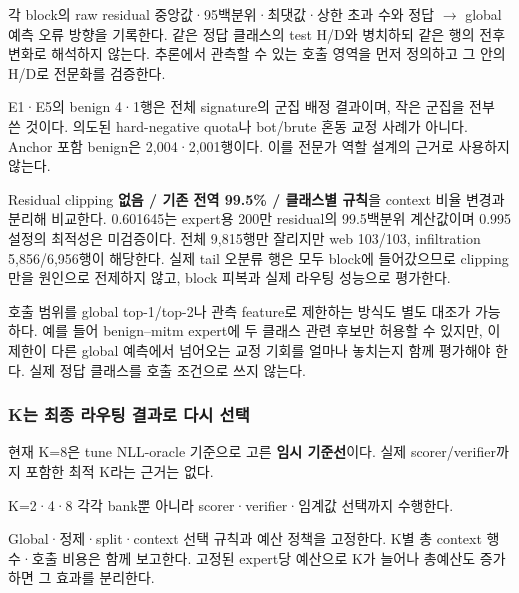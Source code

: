 \par\noindent \textbullet\enspace 각 block의 raw residual 중앙값·95백분위·최댓값·상한 초과 수와 정답 \ensuremath{\rightarrow} global 예측 오류 방향을 기록한다. 같은 정답 클래스의 test H/\allowbreak{}D와 병치하되 같은 행의 전후 변화로 해석하지 않는다. 추론에서 관측할 수 있는 호출 영역을 먼저 정의하고 그 안의 H/\allowbreak{}D로 전문화를 검증한다.


\par\noindent \textbullet\enspace E1·E5의 benign 4·1행은 전체 signature의 군집 배정 결과이며, 작은 군집을 전부 쓴 것이다. 의도된 hard-negative quota나 bot/\allowbreak{}brute 혼동 교정 사례가 아니다. Anchor 포함 benign은 2,004·2,001행이다. 이를 전문가 역할 설계의 근거로 사용하지 않는다.


\par\noindent \textbullet\enspace Residual clipping \textbf{없음 /\allowbreak{} 기존 전역 99.5\% /\allowbreak{} 클래스별 규칙}을 context 비율 변경과 분리해 비교한다. 0.601645는 expert용 200만 residual의 99.5백분위 계산값이며 0.995 설정의 최적성은 미검증이다. 전체 9,815행만 잘리지만 web 103/\allowbreak{}103, infiltration 5,856/\allowbreak{}6,956행이 해당한다. 실제 tail 오분류 행은 모두 block에 들어갔으므로 clipping만을 원인으로 전제하지 않고, block 피복과 실제 라우팅 성능으로 평가한다.


호출 범위를 global top-1/\allowbreak{}top-2나 관측 feature로 제한하는 방식도 별도 대조가 가능하다. 예를 들어 benign–mitm expert에 두 클래스 관련 후보만 허용할 수 있지만, 이 제한이 다른 global 예측에서 넘어오는 교정 기회를 얼마나 놓치는지 함께 평가해야 한다. 실제 정답 클래스를 호출 조건으로 쓰지 않는다.

\subsubsection{K는 최종 라우팅 결과로 다시 선택}
현재 K=\allowbreak{}8은 tune NLL-oracle 기준으로 고른 \textbf{임시 기준선}이다. 실제 scorer/\allowbreak{}verifier까지 포함한 최적 K라는 근거는 없다.

\par\noindent \textbullet\enspace K=\allowbreak{}2·4·8 각각 bank뿐 아니라 scorer·verifier·임계값 선택까지 수행한다.


\par\noindent \textbullet\enspace Global·정제·split·context 선택 규칙과 예산 정책을 고정한다. K별 총 context 행 수·호출 비용은 함께 보고한다. 고정된 expert당 예산으로 K가 늘어나 총예산도 증가하면 그 효과를 분리한다.


